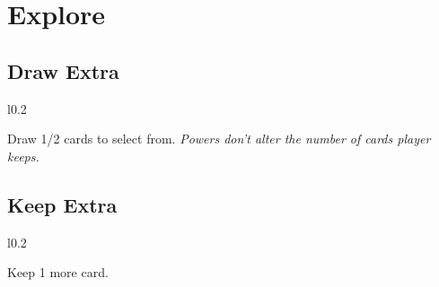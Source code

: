 \documentclass[letterpaper,landscape,twocolumn,8pt]{extarticle}
\begin{document}
\section{Explore}%

\begin{minipage}[t]{\calc{1/3}\columnwidth}
\subsection*{Draw Extra}

\setlength{\intextsep}{0pt}%

\begin{wrapfigure}{l}{0.2\columnwidth}
    
    \smallbreak{}
    
\end{wrapfigure}

Draw 1/2 cards to select from.
\smallbreak{}
\textit{Powers don't alter the number of cards player keeps.}

\end{minipage}
\begin{minipage}[t]{0.3\columnwidth}
\subsection*{Keep Extra}

\setlength{\intextsep}{0pt}%

\begin{wrapfigure}{l}{0.2\columnwidth}
    
\end{wrapfigure}

Keep 1 more card.

\end{minipage}
\end{document}
